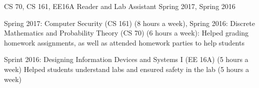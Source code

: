 \begin{cventries}
    
  \cventry
    {CS 70, CS 161, EE16A} %
    {Reader and Lab Assistant} %
    {Spring 2017, Spring 2016} %
    {} %
    {
      \begin{cvitems} %
        \item {Spring 2017: Computer Security (CS 161) (8 hours a week), Spring 2016: Discrete Mathematics and Probability Theory (CS 70) (6 hours a week): Helped grading homework assignments, as well as attended homework parties to help students}
         \item {Sprint 2016: Designing Information Devices and Systems I (EE 16A) (5 hours a week) Helped students understand labs and ensured safety in the lab (5 hours a week)}
      \end{cvitems}
    }

 
\end{cventries}
